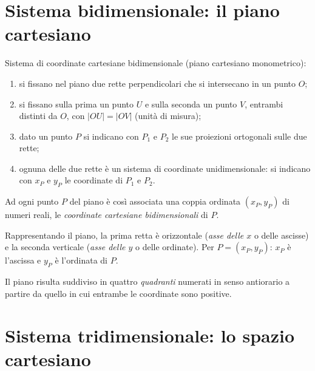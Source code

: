 \documentclass[11pt,a4paper]{article}
\begin{document}
\section{Sistema bidimensionale: il piano cartesiano}

Sistema di coordinate cartesiane bidimensionale (piano cartesiano monometrico):
\begin{enumerate}
    \item si fissano nel piano due rette perpendicolari che si intersecano in un punto $O$;
    \item si fissano sulla prima un punto $U$ e sulla seconda un punto $V$, entrambi distinti da $O$, con $|OU| = |OV|$ (unità di misura);
    \item dato un punto $P$ si indicano con $P_1$ e $P_2$ le sue proiezioni ortogonali sulle due rette;
    \item ognuna delle due rette è un sistema di coordinate unidimensionale: si indicano con $x_P$ e $y_P$ le coordinate di $P_1$ e $P_2$.
\end{enumerate}
Ad ogni punto $P$ del piano è così associata una coppia ordinata $(x_P, y_P)$ di numeri reali, le \emph{coordinate cartesiane bidimensionali} di $P$.

Rappresentando il piano, la prima retta è orizzontale (\emph{asse delle $x$} o delle ascisse) e la seconda verticale (\emph{asse delle $y$} o delle ordinate). Per $P = (x_P, y_P)$: $x_P$ è l'ascissa e $y_P$ è l'ordinata di $P$.

Il piano risulta suddiviso in quattro \emph{quadranti} numerati in senso antiorario a partire da quello in cui entrambe le coordinate sono positive.

\begin{center}
\end{center}

\section{Sistema tridimensionale: lo spazio cartesiano}
\end{document}
